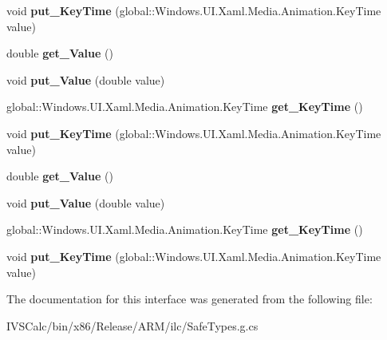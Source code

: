 \begin{DoxyCompactItemize}
void {\bfseries put\+\_\+\+Key\+Time} (global\+::\+Windows.\+U\+I.\+Xaml.\+Media.\+Animation.\+Key\+Time value)
\item 
\mbox{\label{interface_windows_1_1_u_i_1_1_xaml_1_1_media_1_1_animation_1_1_i_double_key_frame_aa6f676c3479f134fab59f2ae812e3ffd}} 
double {\bfseries get\+\_\+\+Value} ()
\item 
\mbox{\label{interface_windows_1_1_u_i_1_1_xaml_1_1_media_1_1_animation_1_1_i_double_key_frame_a2e2235aea49078188c36c1f9080d58a9}} 
void {\bfseries put\+\_\+\+Value} (double value)
\item 
\mbox{\label{interface_windows_1_1_u_i_1_1_xaml_1_1_media_1_1_animation_1_1_i_double_key_frame_acbf6eb01d1f5653483101308780bcf9c}} 
global\+::\+Windows.\+U\+I.\+Xaml.\+Media.\+Animation.\+Key\+Time {\bfseries get\+\_\+\+Key\+Time} ()
\item 
\mbox{\label{interface_windows_1_1_u_i_1_1_xaml_1_1_media_1_1_animation_1_1_i_double_key_frame_a2a3791646e36b2ce46d0900686e544f5}} 
void {\bfseries put\+\_\+\+Key\+Time} (global\+::\+Windows.\+U\+I.\+Xaml.\+Media.\+Animation.\+Key\+Time value)
\item 
\mbox{\label{interface_windows_1_1_u_i_1_1_xaml_1_1_media_1_1_animation_1_1_i_double_key_frame_aa6f676c3479f134fab59f2ae812e3ffd}} 
double {\bfseries get\+\_\+\+Value} ()
\item 
\mbox{\label{interface_windows_1_1_u_i_1_1_xaml_1_1_media_1_1_animation_1_1_i_double_key_frame_a2e2235aea49078188c36c1f9080d58a9}} 
void {\bfseries put\+\_\+\+Value} (double value)
\item 
\mbox{\label{interface_windows_1_1_u_i_1_1_xaml_1_1_media_1_1_animation_1_1_i_double_key_frame_acbf6eb01d1f5653483101308780bcf9c}} 
global\+::\+Windows.\+U\+I.\+Xaml.\+Media.\+Animation.\+Key\+Time {\bfseries get\+\_\+\+Key\+Time} ()
\item 
\mbox{\label{interface_windows_1_1_u_i_1_1_xaml_1_1_media_1_1_animation_1_1_i_double_key_frame_a2a3791646e36b2ce46d0900686e544f5}} 
void {\bfseries put\+\_\+\+Key\+Time} (global\+::\+Windows.\+U\+I.\+Xaml.\+Media.\+Animation.\+Key\+Time value)
\end{DoxyCompactItemize}


The documentation for this interface was generated from the following file\+:\begin{DoxyCompactItemize}
\item 
I\+V\+S\+Calc/bin/x86/\+Release/\+A\+R\+M/ilc/Safe\+Types.\+g.\+cs\end{DoxyCompactItemize}
